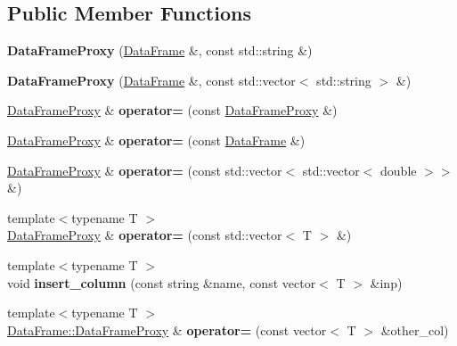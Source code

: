 \subsection*{Public Member Functions}
\begin{DoxyCompactItemize}
\item 
\mbox{\label{classDataFrame_1_1DataFrameProxy_ada735f045032e0f804c1158ca6786746}} 
{\bfseries Data\+Frame\+Proxy} (\hyperlink{classDataFrame}{Data\+Frame} \&, const std\+::string \&)
\item 
\mbox{\label{classDataFrame_1_1DataFrameProxy_ac7a390ace45f4ae0f4deaf0c7eedc90d}} 
{\bfseries Data\+Frame\+Proxy} (\hyperlink{classDataFrame}{Data\+Frame} \&, const std\+::vector$<$ std\+::string $>$ \&)
\item 
\mbox{\label{classDataFrame_1_1DataFrameProxy_a6d56fc9161384065db7812e513313731}} 
\hyperlink{classDataFrame_1_1DataFrameProxy}{Data\+Frame\+Proxy} \& {\bfseries operator=} (const \hyperlink{classDataFrame_1_1DataFrameProxy}{Data\+Frame\+Proxy} \&)
\item 
\mbox{\label{classDataFrame_1_1DataFrameProxy_a680def6fdcc7d488e10b2dba471f8854}} 
\hyperlink{classDataFrame_1_1DataFrameProxy}{Data\+Frame\+Proxy} \& {\bfseries operator=} (const \hyperlink{classDataFrame}{Data\+Frame} \&)
\item 
\mbox{\label{classDataFrame_1_1DataFrameProxy_ae6c8c653d011966f9bf91396123bb0a5}} 
\hyperlink{classDataFrame_1_1DataFrameProxy}{Data\+Frame\+Proxy} \& {\bfseries operator=} (const std\+::vector$<$ std\+::vector$<$ double $>$$>$ \&)
\item 
\mbox{\label{classDataFrame_1_1DataFrameProxy_a25774e44f4e4d36e5b640e7387d24361}} 
{\footnotesize template$<$typename T $>$ }\\\hyperlink{classDataFrame_1_1DataFrameProxy}{Data\+Frame\+Proxy} \& {\bfseries operator=} (const std\+::vector$<$ T $>$ \&)
\item 
\mbox{\label{classDataFrame_1_1DataFrameProxy_a74080fd3f0407cefdb332062ca91ecc9}} 
{\footnotesize template$<$typename T $>$ }\\void {\bfseries insert\+\_\+column} (const string \&name, const vector$<$ T $>$ \&inp)
\item 
\mbox{\label{classDataFrame_1_1DataFrameProxy_a6910b480e16f67a6ae3f5d36757c0a57}} 
{\footnotesize template$<$typename T $>$ }\\\hyperlink{classDataFrame_1_1DataFrameProxy}{Data\+Frame\+::\+Data\+Frame\+Proxy} \& {\bfseries operator=} (const vector$<$ T $>$ \&other\+\_\+col)
\end{DoxyCompactItemize}
